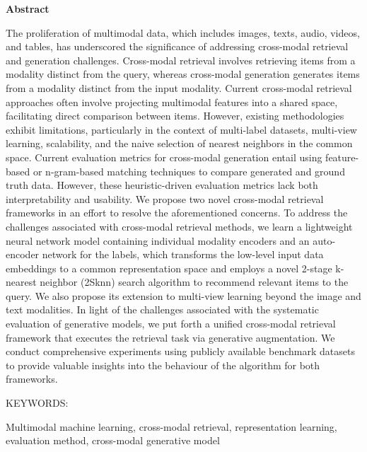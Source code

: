 \centerline{ \large \bf Abstract}

The proliferation of multimodal data, which includes images, texts, audio, videos, and tables, has underscored the significance of addressing cross-modal retrieval and generation challenges. Cross-modal retrieval involves retrieving items from a modality distinct from the query, whereas cross-modal generation generates items from a modality distinct from the input modality. Current cross-modal retrieval approaches often involve projecting multimodal features into a shared space, facilitating direct comparison between items. However, existing methodologies exhibit limitations, particularly in the context of multi-label datasets, multi-view learning, scalability, and the naive selection of nearest neighbors in the common space. Current evaluation metrics for cross-modal generation entail using feature-based or n-gram-based matching techniques to compare generated and ground truth data. However, these heuristic-driven evaluation metrics lack both interpretability and usability. We propose two novel cross-modal retrieval frameworks in an effort to resolve the aforementioned concerns. To address the challenges associated with cross-modal retrieval methods, we learn a lightweight neural network model containing individual modality encoders and an auto-encoder network for the labels, which transforms the low-level input data embeddings to a common representation space and employs a novel 2-stage k-nearest neighbor (2Sknn) search algorithm to recommend relevant items to the query. We also propose its extension to multi-view learning beyond the image and text modalities. In light of the challenges associated with the systematic evaluation of generative models, we put forth a unified cross-modal retrieval framework that executes the retrieval task via generative augmentation. We conduct comprehensive experiments using publicly available benchmark datasets to provide valuable insights into the behaviour of the algorithm for both frameworks.

\vspace*{24pt}

\noindent KEYWORDS: \hspace*{0.5em} \parbox[t]{4.4in}{Multimodal machine learning, cross-modal retrieval, representation learning, evaluation method, cross-modal generative model}

\pagebreak